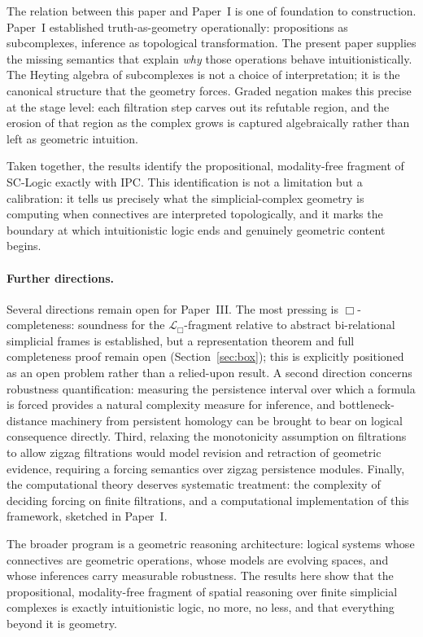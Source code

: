 \documentclass[final,12pt]{elsarticle}
\theoremstyle{plain}
\theoremstyle{definition}
\begin{document}
The relation between this paper and Paper~I is one of foundation to construction. Paper~I established truth-as-geometry operationally: propositions as subcomplexes, inference as topological transformation. The present paper supplies the missing semantics that explain \emph{why} those operations behave intuitionistically. The Heyting algebra of subcomplexes is not a choice of interpretation; it is the canonical structure that the geometry forces. Graded negation makes this precise at the stage level: each filtration step carves out its refutable region, and the erosion of that region as the complex grows is captured algebraically rather than left as geometric intuition.

Taken together, the results identify the propositional, modality-free fragment of SC-Logic exactly with IPC. This identification is not a limitation but a calibration: it tells us precisely what the simplicial-complex geometry is computing when connectives are interpreted topologically, and it marks the boundary at which intuitionistic logic ends and genuinely geometric content begins.

\paragraph{Further directions.}

Several directions remain open for Paper~III. The most pressing is
\(\Box\)-completeness: soundness for the
\(\mathcal{L}_\Box\)-fragment relative to abstract bi-relational simplicial frames
is established, but a representation theorem and full completeness proof remain
open (Section~\ref{sec:box}); this is explicitly positioned as an open problem
rather than a relied-upon result. A second direction concerns robustness
quantification: measuring the persistence interval over which a formula is forced
provides a natural complexity measure for inference, and bottleneck-distance
machinery from persistent homology can be brought to bear on logical consequence
directly. Third, relaxing the monotonicity assumption on filtrations to allow
zigzag filtrations would model revision and retraction of geometric evidence,
requiring a forcing semantics over zigzag persistence modules. Finally, the
computational theory deserves systematic treatment: the complexity of deciding
forcing on finite filtrations, and a computational implementation of this
framework, sketched in Paper~I.

The broader program is a geometric reasoning architecture: logical systems whose
connectives are geometric operations, whose models are evolving spaces, and whose
inferences carry measurable robustness. The results here show that the
propositional, modality-free fragment of spatial reasoning over finite simplicial
complexes is exactly intuitionistic logic, no more, no less, and that everything
beyond it is geometry.



\end{document}
